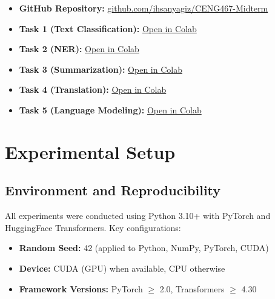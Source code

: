 \documentclass[12pt, a4paper]{article}
\begin{document}
\begin{itemize}
    \item \textbf{GitHub Repository:} \href{https://github.com/ihsanyagiz/CENG467-Midterm}{github.com/ihsanyagiz/CENG467-Midterm}
    \item \textbf{Task 1 (Text Classification):} \href{https://colab.research.google.com/github/ihsanyagiz/CENG467-Midterm/blob/main/notebooks/Task1_TextClassification.ipynb}{Open in Colab}
    \item \textbf{Task 2 (NER):} \href{https://colab.research.google.com/github/ihsanyagiz/CENG467-Midterm/blob/main/notebooks/Task2_NER.ipynb}{Open in Colab}
    \item \textbf{Task 3 (Summarization):} \href{https://colab.research.google.com/github/ihsanyagiz/CENG467-Midterm/blob/main/notebooks/Task3_Summarization.ipynb}{Open in Colab}
    \item \textbf{Task 4 (Translation):} \href{https://colab.research.google.com/github/ihsanyagiz/CENG467-Midterm/blob/main/notebooks/Task4_Translation.ipynb}{Open in Colab}
    \item \textbf{Task 5 (Language Modeling):} \href{https://colab.research.google.com/github/ihsanyagiz/CENG467-Midterm/blob/main/notebooks/Task5_LanguageModeling.ipynb}{Open in Colab}
\end{itemize}

\section{Experimental Setup}

\subsection{Environment and Reproducibility}

All experiments were conducted using Python 3.10+ with PyTorch and HuggingFace Transformers. Key configurations:

\begin{itemize}
    \item \textbf{Random Seed:} 42 (applied to Python, NumPy, PyTorch, CUDA)
    \item \textbf{Device:} CUDA (GPU) when available, CPU otherwise
    \item \textbf{Framework Versions:} PyTorch $\geq$ 2.0, Transformers $\geq$ 4.30
\end{itemize}
\end{document}
